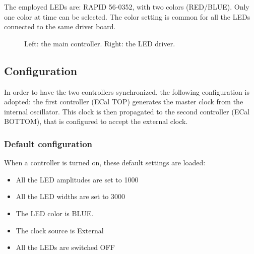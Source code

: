\documentclass[12pt]{article}
\begin{document}
The employed LEDs are: RAPID 56-0352, with two colors (RED/BLUE). Only one color at time can be selected. The color setting is common for all the LEDs connected to the same driver board.

\begin{figure}
\center
{}\quad
{}
\caption{\small \label{fig1} Left: the main controller. Right: the LED driver.}
\end{figure}


\subsection{Configuration}

In order to have the two controllers synchronized, the following configuration is adopted: the first controller (ECal TOP) generates the master clock from the internal oscillator. This clock is then propagated to the second controller (ECal BOTTOM), that is configured to accept the external clock.

\subsubsection{Default configuration}

When a controller is turned on, these default settings are loaded:

\begin{itemize}
\item{All the LED amplitudes are set to 1000}
\item{All the LED widths are set to 3000}
\item{The LED color is BLUE.}
\item{The clock source is External}
\item{All the LEDs are switched OFF}
\end{itemize}
\end{document}
